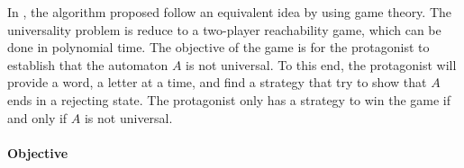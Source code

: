 \documentclass[letterpaper]{article}
\DeclarePairedDelimiter{\ceil}{\lceil}{\rceil}
\theoremstyle{definition}
\begin{document}



In
\cite{AC_universality}, the algorithm proposed follow an equivalent
idea by using game theory. The universality problem is reduce to
a two-player reachability game, which can be done in polynomial time.
The objective of the game is for the protagonist to establish that
the automaton $A$ is not universal. To this end, the protagonist will
provide a word, a letter at a time, and find a strategy that try
to show that $A$ ends in a rejecting state.
The protagonist only has a strategy to win the game if and only if $A$ is
not universal.


\paragraph{Objective}
\end{document}
